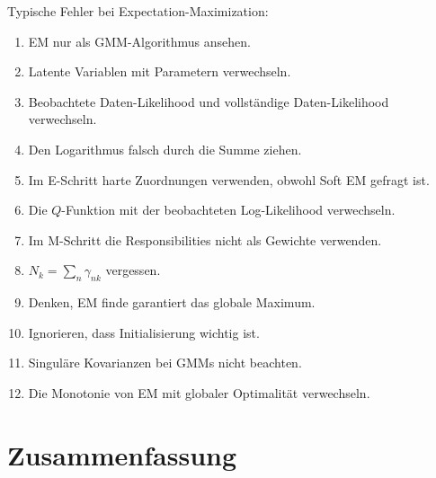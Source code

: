 \begin{examtipbox}
Typische Fehler bei Expectation-Maximization:

\begin{enumerate}
    \item EM nur als GMM-Algorithmus ansehen.
    \item Latente Variablen mit Parametern verwechseln.
    \item Beobachtete Daten-Likelihood und vollständige Daten-Likelihood verwechseln.
    \item Den Logarithmus falsch durch die Summe ziehen.
    \item Im E-Schritt harte Zuordnungen verwenden, obwohl Soft EM gefragt ist.
    \item Die \(Q\)-Funktion mit der beobachteten Log-Likelihood verwechseln.
    \item Im M-Schritt die Responsibilities nicht als Gewichte verwenden.
    \item \(N_k=\sum_n\gamma_{nk}\) vergessen.
    \item Denken, EM finde garantiert das globale Maximum.
    \item Ignorieren, dass Initialisierung wichtig ist.
    \item Singuläre Kovarianzen bei GMMs nicht beachten.
    \item Die Monotonie von EM mit globaler Optimalität verwechseln.
\end{enumerate}
\end{examtipbox}

\section{Zusammenfassung}

